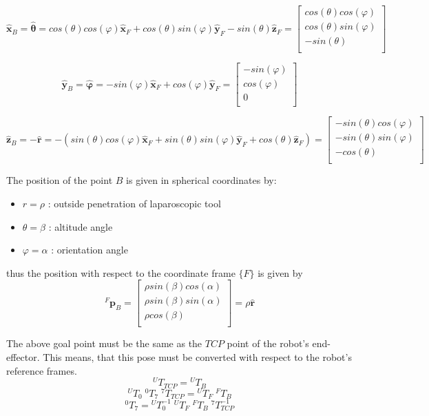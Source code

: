 \[
\hat{\mathbf{x}}^{}_B = \hat{\mathbf{θ}} = cos(θ)cos(φ)\hat{\mathbf{x}}^{}_F + cos(θ)sin(φ)\hat{\mathbf{y}}^{}_F - sin(θ)\hat{\mathbf{z}}^{}_F
= \begin{bmatrix}
cos(θ)cos(φ) \\
cos(θ)sin(φ) \\
- sin(θ) \\
\end{bmatrix}
\]

\[
\hat{\mathbf{y}}^{}_B = \hat{\mathbf{φ}} = -sin(φ)\hat{\mathbf{x}}^{}_F + cos(φ)\hat{\mathbf{y}}^{}_F
= \begin{bmatrix}
-sin(φ) \\
cos(φ) \\
0 \\
\end{bmatrix}
\]

\[
\hat{\mathbf{z}}^{}_B = - \hat{\mathbf{r}} = - (sin(θ)cos(φ)\hat{\mathbf{x}}^{}_F + sin(θ)sin(φ)\hat{\mathbf{y}}^{}_F + cos(θ)\hat{\mathbf{z}}^{}_F)
= \begin{bmatrix}
-sin(θ)cos(φ) \\
-sin(θ)sin(φ) \\
-cos(θ) \\
\end{bmatrix}
\]

The position of the point $B$ is given in spherical coordinates by:
\begin{itemize}
	\item $r=ρ$ : outside penetration of laparoscopic tool
	\item $θ=β$ : altitude angle
	\item $φ=α$ : orientation angle
\end{itemize}
thus the position with respect to the coordinate frame $\lbrace F \rbrace$ is given by
\[
{}^{F}\mathbf{p}^{}_B = \begin{bmatrix}
ρsin(β)cos(α) \\
ρsin(β)sin(α) \\
ρcos(β) \\
\end{bmatrix} = ρ \hat{\mathbf{r}}
\]

The above goal point must be the same as the $TCP$ point of the robot's end-effector. This means, that this pose must be converted with respect to the robot's reference frames.
\[
{}^{U}T^{}_{TCP} = {}^{U}T^{}_{B}
\]
\[
{}^{U}T^{}_{0} \; {}^{0}T^{}_{7} \; {}^{7}T^{}_{TCP} = {}^{U}T^{}_{F} \; {}^{F}T^{}_{B}
\]
\begin{equation}
{}^{0}T^{}_{7} = {}^{U}T^{-1}_{0} \; {}^{U}T^{}_{F} \; {}^{F}T^{}_{B} \; {}^{7}T^{-1}_{TCP}
\end{equation}

